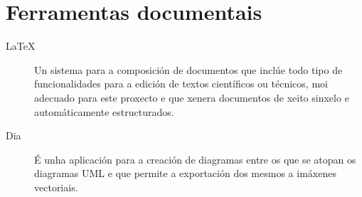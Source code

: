   \section{Ferramentas documentais}


  \begin{description}
   \item [LaTeX]\cite{web:latex} Un sistema para a 
composición de documentos que inclúe todo tipo de funcionalidades para a edición 
de textos científicos ou técnicos, moi adecuado para este proxecto e que xenera 
documentos de xeito sinxelo e automáticamente estructurados.
   \item [Dia]\cite{web:dia} É unha aplicación para a 
creación de diagramas entre os que se atopan os diagramas UML e que permite a 
exportación dos mesmos a imáxenes vectoriais.
  \end{description}
